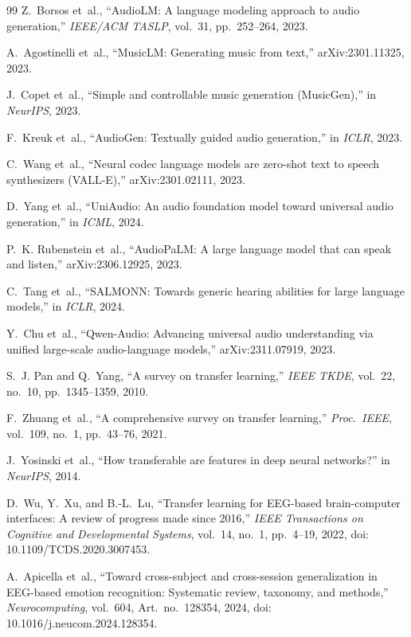 \begin{thebibliography}{99}
Z.~Borsos et~al., ``AudioLM: A language modeling approach to audio generation,''
\emph{IEEE/ACM TASLP}, vol.~31, pp.~252--264, 2023.

A.~Agostinelli et~al., ``MusicLM: Generating music from text,''
arXiv:2301.11325, 2023.

J.~Copet et~al., ``Simple and controllable music generation (MusicGen),'' in
\emph{NeurIPS}, 2023.

F.~Kreuk et~al., ``AudioGen: Textually guided audio generation,'' in
\emph{ICLR}, 2023.

C.~Wang et~al., ``Neural codec language models are zero-shot text to speech
synthesizers (VALL-E),'' arXiv:2301.02111, 2023.

D.~Yang et~al., ``UniAudio: An audio foundation model toward universal audio
generation,'' in \emph{ICML}, 2024.

P.~K. Rubenstein et~al., ``AudioPaLM: A large language model that can speak and
listen,'' arXiv:2306.12925, 2023.

C.~Tang et~al., ``SALMONN: Towards generic hearing abilities for large language
models,'' in \emph{ICLR}, 2024.

Y.~Chu et~al., ``Qwen-Audio: Advancing universal audio understanding via unified
large-scale audio-language models,'' arXiv:2311.07919, 2023.

S.~J. Pan and Q.~Yang, ``A survey on transfer learning,'' \emph{IEEE TKDE},
vol.~22, no.~10, pp.~1345--1359, 2010.

F.~Zhuang et~al., ``A comprehensive survey on transfer learning,''
\emph{Proc.\ IEEE}, vol.~109, no.~1, pp.~43--76, 2021.

J.~Yosinski et~al., ``How transferable are features in deep neural networks?''
in \emph{NeurIPS}, 2014.

D.~Wu, Y.~Xu, and B.-L.~Lu, ``Transfer learning for EEG-based brain-computer
interfaces: A review of progress made since 2016,'' \emph{IEEE Transactions on
Cognitive and Developmental Systems}, vol.~14, no.~1, pp.~4--19, 2022,
doi: 10.1109/TCDS.2020.3007453.

A.~Apicella et~al., ``Toward cross-subject and cross-session generalization in
EEG-based emotion recognition: Systematic review, taxonomy, and methods,''
\emph{Neurocomputing}, vol.~604, Art.~no.~128354, 2024,
doi: 10.1016/j.neucom.2024.128354.


\end{thebibliography}

